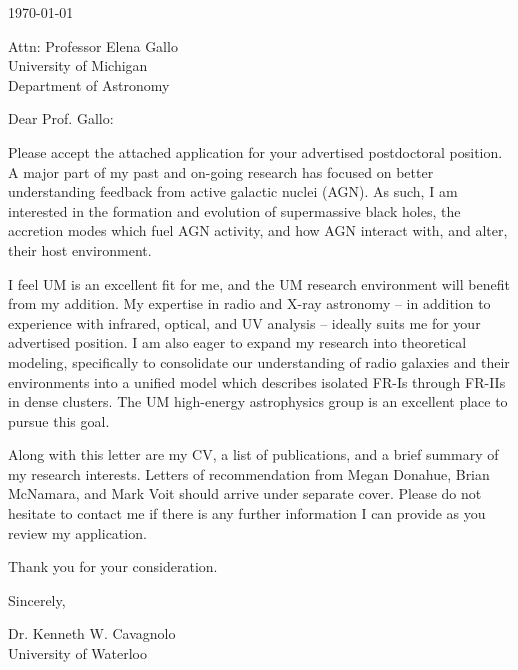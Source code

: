 \documentclass[11pt]{article}
\begin{document}
\today

Attn: Professor Elena Gallo\\
University of Michigan\\
Department of Astronomy

Dear Prof. Gallo:

Please accept the attached application for your advertised
postdoctoral position. A major part of my past and on-going research
has focused on better understanding feedback from active galactic
nuclei (AGN). As such, I am interested in the formation and evolution
of supermassive black holes, the accretion modes which fuel AGN
activity, and how AGN interact with, and alter, their host
environment.

I feel UM is an excellent fit for me, and the UM research environment
will benefit from my addition. My expertise in radio and X-ray
astronomy -- in addition to experience with infrared, optical, and UV
analysis -- ideally suits me for your advertised position. I am also
eager to expand my research into theoretical modeling, specifically to
consolidate our understanding of radio galaxies and their environments
into a unified model which describes isolated FR-Is through FR-IIs in
dense clusters. The UM high-energy astrophysics group is an excellent
place to pursue this goal.

Along with this letter are my CV, a list of publications, and a brief
summary of my research interests. Letters of recommendation from Megan
Donahue, Brian McNamara, and Mark Voit should arrive under separate
cover. Please do not hesitate to contact me if there is any further
information I can provide as you review my application.

Thank you for your consideration.

Sincerely,\\
\begin{minipage}{7.5in}
\end{minipage}
Dr. Kenneth W. Cavagnolo\\
University of Waterloo
\end{document}
